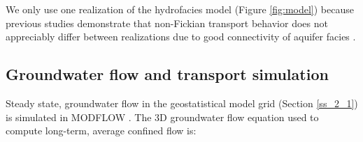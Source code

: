\bgroup
\begin{table}[ht]
\centering
\caption{Hyrdofacies properties including mean lengths $l$ in $xyz$ directions (strike, dip, and vertical in Figure \ref{fig:model}), hydraulic conductivity $K$ ($m/s$), and average Peclet number across the VHGR scenarios.}
\label{tab:model_l_k_pe}
\end{table}

\egroup

We only use one realization of the hydrofacies model (Figure \ref{fig:model}) because previous studies demonstrate that non-Fickian transport behavior does not appreciably differ between realizations due to good connectivity of aquifer facies \citep{guo2019upscaling, weissmann2002dispersion}.


%
%
\subsection{Groundwater flow and transport simulation}
\label{ss_2_2}

Steady state, groundwater flow in the geostatistical model grid (Section \ref{ss_2_1}) is simulated in MODFLOW \citep{harbaugh2000modflow, mcdonald1988modflow}. The 3D groundwater flow equation used to compute long-term, average confined flow is:   


